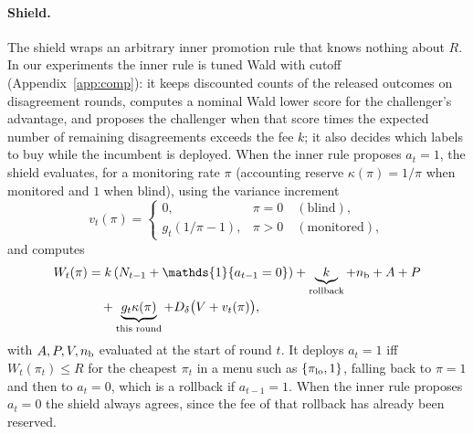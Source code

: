 \documentclass[10pt]{article}
\theoremstyle{plain}
\theoremstyle{definition}
\newcommand{\one}{\mathds{1}}
\begin{document}
\paragraph{Shield.}
The shield wraps an arbitrary inner promotion rule that knows nothing about $R$. In our experiments the inner rule is tuned Wald with cutoff (Appendix~\ref{app:comp}): it keeps discounted counts of the released outcomes on disagreement rounds, computes a nominal Wald lower score for the challenger's advantage, and proposes the challenger when that score times the expected number of remaining disagreements exceeds the fee $k$; it also decides which labels to buy while the incumbent is deployed. When the inner rule proposes $a_t=1$, the shield evaluates, for a monitoring rate $\pi$ (accounting reserve $\kappa(\pi)=1/\pi$ when monitored and $1$ when blind), using the variance increment
\[
v_t(\pi)=\begin{cases}0,&\pi=0\quad(\text{blind}),\\g_t(1/\pi-1),&\pi>0\quad(\text{monitored}),\end{cases}
\]
and computes
{\small\begin{align*}
W_t(\pi)&=k\,(N_{t-1}+\one\{a_{t-1}=0\})+\underbrace{k}_{\text{rollback}}+n_{\rm b}+A+P\\
 &\quad+\underbrace{g_t\kappa(\pi)}_{\text{this round}}+D_\delta\big(V+v_t(\pi)\big),
\end{align*}}
with $A,P,V,n_{\rm b}$ evaluated at the start of round $t$. It deploys $a_t=1$ iff $W_t(\pi_t)\le R$ for the cheapest $\pi_t$ in a menu such as $\{\pi_{\rm lo},1\}$, falling back to $\pi=1$ and then to $a_t=0$, which is a rollback if $a_{t-1}=1$. When the inner rule proposes $a_t=0$ the shield always agrees, since the fee of that rollback has already been reserved.
\end{document}
